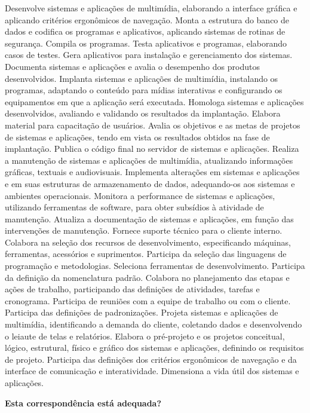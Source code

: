 \documentclass[
]{article}
\begin{document}
Desenvolve sistemas e aplicações de multimídia, elaborando a interface
gráfica e aplicando critérios ergonômicos de navegação. Monta a
estrutura do banco de dados e codifica os programas e aplicativos,
aplicando sistemas de rotinas de segurança. Compila os programas. Testa
aplicativos e programas, elaborando casos de testes. Gera aplicativos
para instalação e gerenciamento dos sistemas. Documenta sistemas e
aplicações e avalia o desempenho dos produtos desenvolvidos. Implanta
sistemas e aplicações de multimídia, instalando os programas, adaptando
o conteúdo para mídias interativas e configurando os equipamentos em que
a aplicação será executada. Homologa sistemas e aplicações
desenvolvidos, avaliando e validando os resultados da implantação.
Elabora material para capacitação de usuários. Avalia os objetivos e as
metas de projetos de sistemas e aplicações, tendo em vista os resultados
obtidos na fase de implantação. Publica o código final no servidor de
sistemas e aplicações. Realiza a manutenção de sistemas e aplicações de
multimídia, atualizando informações gráficas, textuais e audiovisuais.
Implementa alterações em sistemas e aplicações e em suas estruturas de
armazenamento de dados, adequando-os aos sistemas e ambientes
operacionais. Monitora a performance de sistemas e aplicações,
utilizando ferramentas de software, para obter subsídios à atividade de
manutenção. Atualiza a documentação de sistemas e aplicações, em função
das intervenções de manutenção. Fornece suporte técnico para o cliente
interno. Colabora na seleção dos recursos de desenvolvimento,
especificando máquinas, ferramentas, acessórios e suprimentos. Participa
da seleção das linguagens de programação e metodologias. Seleciona
ferramentas de desenvolvimento. Participa da definição da nomenclatura
padrão. Colabora no planejamento das etapas e ações de trabalho,
participando das definições de atividades, tarefas e cronograma.
Participa de reuniões com a equipe de trabalho ou com o cliente.
Participa das definições de padronizações. Projeta sistemas e aplicações
de multimídia, identificando a demanda do cliente, coletando dados e
desenvolvendo o leiaute de telas e relatórios. Elabora o pré-projeto e
os projetos conceitual, lógico, estrutural, físico e gráfico dos
sistemas e aplicações, definindo os requisitos de projeto. Participa das
definições dos critérios ergonômicos de navegação e da interface de
comunicação e interatividade. Dimensiona a vida útil dos sistemas e
aplicações.

\begin{Form}
\textbf{Esta correspondência está adequada?} \\ 
\end{Form}
\end{document}
